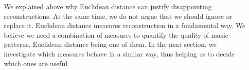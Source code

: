 \documentclass{article}
\begin{document}
We explained above why Euclidean distance can justify disappointing
reconstructions. At the same time, we do not argue that we should
ignore or replace it. Euclidean distance measures reconstruction in a
fundamental way. We believe we need a combination of measures to
quantify the quality of music patterns, Euclidean distance being one
of them. In the next section, we investigate which measures behave in
a similar way, thus helping us to decide which ones are useful.

\end{document}
